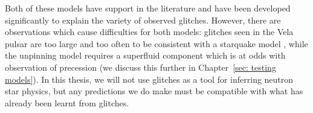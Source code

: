 Both of these models have support in the literature and have been developed
significantly to explain the variety of observed glitches. However, there are
observations which cause difficulties for both models: glitches seen in the
Vela pulsar are too large and too often to be consistent with a starquake model
\citep{chamel2008physics}, while the unpinning model requires a superfluid
component which is at odds with observation of precession (we discuss this
further in Chapter~\ref{sec: testing models}). In this thesis, we will not use
glitches as a tool for inferring neutron star physics, but any predictions we
do make must be compatible with what has already been learnt from glitches.


